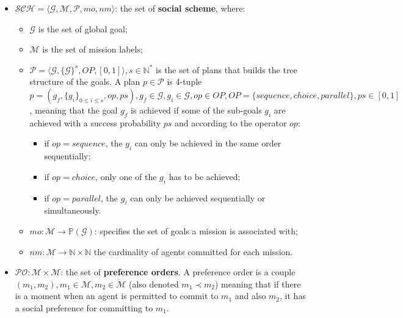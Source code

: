 \documentclass[sn-mathphys-num]{sn-jnl}%
\theoremstyle{thmstyleone}%
\theoremstyle{thmstyletwo}%
\theoremstyle{thmstylethree}%
\begin{document}
\begin{itemize}
    \item $\mathcal{SCH} = \langle\mathcal{G}, \mathcal{M}, \mathcal{P}, mo, nm \rangle$: the set of \textbf{social scheme}, where:
          \begin{itemize}
              \item $\mathcal{G}$ is the set of global goal;

              \item $\mathcal{M}$ is the set of mission labels;
              \item $\mathcal{P} = \langle \mathcal{G}, \{\mathcal{G}\}^s, OP, [0,1] \rangle, s \in \mathbb{N}^*$ is the set of plans that builds the tree structure of the goals.
                    A plan $p \in \mathcal{P}$ is 4-tuple $p=(g_f,\{g_i\}_{0 \leq i \leq s}, op, ps), g_f \in \mathcal{G}, g_i \in \mathcal{G}, op \in OP, OP = \{sequence, choice, parallel\}, ps \in [0,1]$, meaning that the goal $g_f$ is achieved if some of the sub-goals $g_i$ are achieved with a success probability $ps$ and according to the operator $op$:
                    \begin{itemize}
                        \item if $op = sequence$, the $g_i$ can only be achieved in the same order sequentially;
                        \item if $op = choice$, only one of the $g_i$ has to be achieved;
                        \item if $op = parallel$, the $g_i$ can only be achieved sequentially or simultaneously.
                    \end{itemize}

              \item $mo: \mathcal{M} \rightarrow \mathbb{P}(\mathcal{G})$: specifies the set of goals a mission is associated with;
              \item $nm: \mathcal{M} \rightarrow \mathbb{N} \times \mathbb{N}$ the cardinality of agents committed for each mission.
          \end{itemize}
    \item $\mathcal{PO}: \mathcal{M} \times \mathcal{M}$: the set of \textbf{preference orders}. A preference order is a couple $(m_1, m_2), m_1 \in \mathcal{M}, m_2 \in \mathcal{M}$ (also denoted $m_{1} \prec m_{2}$) meaning that if there is a moment when an agent is permitted to commit to $m_{1}$ and also $m_{2}$, it has a social preference for committing to $m_{1}$.
\end{itemize}
\end{document}
